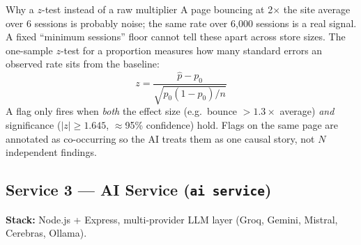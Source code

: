 \documentclass[11pt,a4paper]{article}
\begin{document}
\begin{keybox}{Why a $z$-test instead of a raw multiplier}
A page bouncing at 2$\times$ the site average over 6 sessions is probably
noise; the same rate over 6{,}000 sessions is a real signal. A fixed
``minimum sessions'' floor cannot tell these apart across store sizes. The
one-sample $z$-test for a proportion measures how many standard errors an
observed rate sits from the baseline:
\[
z = \frac{\hat{p} - p_0}{\sqrt{p_0(1-p_0)/n}}
\]
A flag only fires when \emph{both} the effect size (e.g.\ bounce $>1.3\times$
average) \emph{and} significance ($|z| \ge 1.645$, $\approx$95\% confidence)
hold. Flags on the same page are annotated as co-occurring so the AI treats
them as one causal story, not $N$ independent findings.
\end{keybox}

\subsection{Service 3 --- AI Service (\texttt{ai service})}

\textbf{Stack:} Node.js + Express, multi-provider LLM layer (Groq, Gemini,
Mistral, Cerebras, Ollama).
\end{document}
